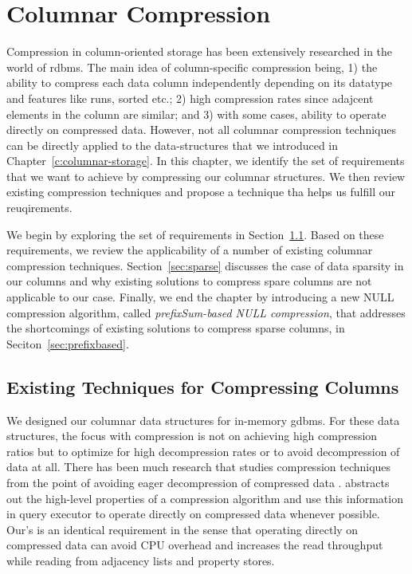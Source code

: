 \chapter{Columnar Compression}
\label{columnar-compression}

Compression in column-oriented storage has been extensively researched \cite{abadi-col-comp, abadi-sparse-col, boncz-comp} in the world of \gls{rdbms}. The main idea of column-specific compression being, 1) the ability to compress each data column independently depending on its datatype and features like runs, sorted etc.; 2) high compression rates since adajcent elements in the column are similar; and 3) with some cases, ability to operate directly on compressed data. However, not all columnar compression techniques can be directly applied to the data-structures that we introduced in Chapter~\ref{c:columnar-storage}. In this chapter, we identify the set of requirements that we want to achieve by compressing our columnar structures. We then review existing compression techniques and propose a technique tha helps us fulfill our reuqirements.

We begin by exploring the set of requirements in Section~\ref{sec:col-existing}. Based on these requirements, we review the applicability of a number of existing columnar compression techniques. Section~\ref{sec:sparse} discusses the case of data sparsity in our columns and why existing solutions to compress spare columns are not applicable to our case. Finally, we end the chapter by introducing a new NULL compression algorithm, called \emph{prefixSum-based NULL compression}, that addresses the shortcomings of existing solutions to compress sparse columns, in Seciton~\ref{sec:prefixbased}.

\section{Existing Techniques for Compressing Columns}
\label{sec:col-existing}

We designed our columnar data structures for in-memory \gls{gdbms}. For these data structures, the focus with compression is not on achieving high compression ratios but to optimize for high decompression rates or to avoid decompression of data at all. There has been much research that studies compression techniques from the point of avoiding eager decompression of compressed data \cite{westmann-comp, dat-comp}. \cite{abadi-col-comp} abstracts out the high-level properties of a compression algorithm and use this information in query executor to operate directly on compressed data whenever possible. Our's is an identical requirement in the sense that operating directly on compressed data can avoid CPU overhead and increases the read throughput while reading from adjacency lists and property stores.

